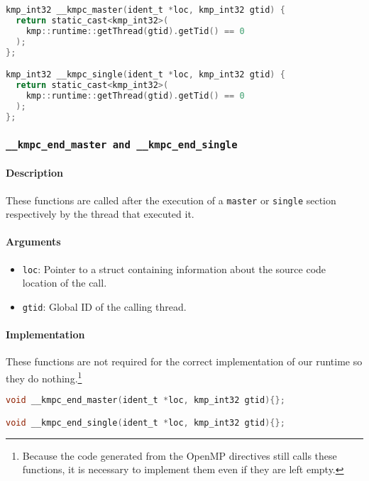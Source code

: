 \begin{lstlisting}[language=C, caption={__kmpc_master and __kmpc_single},
                   label={lst:kmpc-master}, escapechar=@]
kmp_int32 __kmpc_master(ident_t *loc, kmp_int32 gtid) {
  return static_cast<kmp_int32>(
    kmp::runtime::getThread(gtid).getTid() == 0
  );
};

kmp_int32 __kmpc_single(ident_t *loc, kmp_int32 gtid) {
  return static_cast<kmp_int32>(
    kmp::runtime::getThread(gtid).getTid() == 0
  );
};
\end{lstlisting}

\subsubsection{\texttt{__kmpc_end_master and __kmpc_end_single}}

\paragraph{Description} These functions are called after the execution of a \texttt{master} or
\texttt{single} section respectively by the thread that executed it.

\paragraph{Arguments}
\begin{itemize}
	\item \texttt{loc}: Pointer to a struct containing information about the source code location
	      of the call.
	\item \texttt{gtid}: Global ID of the calling thread.
\end{itemize}

\paragraph{Implementation} These functions are not required for the correct implementation of our
runtime so they do nothing.\footnote{Because the code generated from the OpenMP directives still
	calls these functions, it is necessary to implement them even if they are left empty.}

\begin{lstlisting}[language=C, caption={__kmpc_end_master and __kmpc_end_single},
                   label={lst:kmpc-end-master}, escapechar=@]
void __kmpc_end_master(ident_t *loc, kmp_int32 gtid){};

void __kmpc_end_single(ident_t *loc, kmp_int32 gtid){};
\end{lstlisting}

